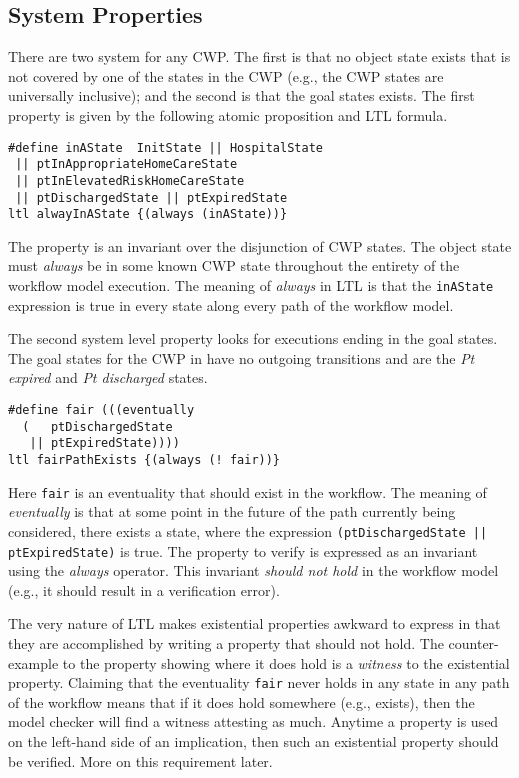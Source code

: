 \subsection{System Properties}
There are two system for any CWP. The first is that no object state exists that is not covered by one of the states in the CWP (e.g., the CWP states are universally inclusive); and the second is that the goal states exists. The first property is given by the following atomic proposition and LTL formula.
%
{\small
\begin{lstlisting}[style=myPromela]
#define inAState  InitState || HospitalState 
 || ptInAppropriateHomeCareState 
 || ptInElevatedRiskHomeCareState
 || ptDischargedState || ptExpiredState
ltl alwayInAState {(always (inAState))}
\end{lstlisting}
}
%
\noindent The property is an invariant over the disjunction of CWP states. The object state must \emph{always} be in some known CWP state throughout the entirety of the workflow model execution. The meaning of \emph{always} in LTL is that the \texttt{inAState} expression is true in every state along every path of the workflow model.

The second system level property looks for executions ending in the goal states. The goal states for the CWP in  have no outgoing transitions and are the \emph{Pt expired} and \emph{Pt discharged} states.
%
{\small
\begin{lstlisting}[style=myPromela]
#define fair (((eventually 
  (   ptDischargedState 
   || ptExpiredState))))
ltl fairPathExists {(always (! fair))}
\end{lstlisting}
}
%
\noindent Here \texttt{fair} is an eventuality that should exist in the workflow. The meaning of \emph{eventually} is that at some point in the future of the path currently being considered, there exists a state, where the expression \texttt{(ptDischargedState || ptExpiredState)} is true. The property to verify is expressed as an invariant using the \emph{always} operator. This invariant \emph{should not hold} in the workflow model (e.g., it should result in a verification error). 

The very nature of LTL makes existential properties awkward to express in that they are accomplished by writing a property that should not hold. The counter-example to the property showing where it does hold is a \emph{witness} to the existential property. Claiming that the eventuality \texttt{fair} never holds in any state in any path of the workflow means that if it does hold somewhere (e.g., exists), then the model checker will find a witness attesting as much. Anytime a property is used on the left-hand side of an implication, then such an existential property should be verified. More on this requirement later.

